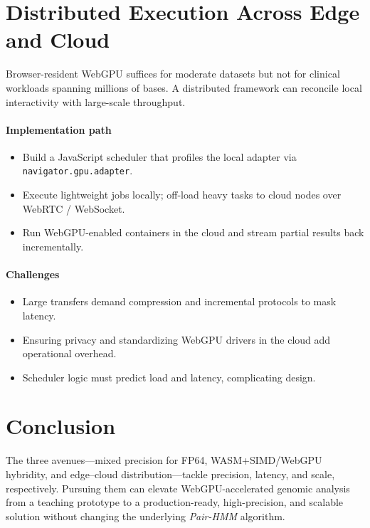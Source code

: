 \documentclass[PhD]{PHlab-thesis}
\begin{document}
\section{Distributed Execution Across Edge and Cloud}

Browser-resident WebGPU suffices for moderate datasets but not for clinical workloads spanning millions of bases\cite{W3C2024-webgpu,MDN2025-webgpuapi}.  
A distributed framework can reconcile local interactivity with large-scale throughput\cite{Krampis2012,Stone2010-opencl}.

\paragraph{Implementation path}
\begin{itemize}
  \item Build a JavaScript scheduler that profiles the local adapter via \\ \texttt{navigator.gpu.adapter}\cite{MDN2025-webgpuapi}.
  \item Execute lightweight jobs locally; off-load heavy tasks to cloud nodes over WebRTC / WebSocket\cite{W3C2024-webgpu}.
  \item Run WebGPU-enabled containers in the cloud and stream partial results back incrementally\cite{Krampis2012}.
\end{itemize}

\paragraph{Challenges}
\begin{itemize}
  \item Large transfers demand compression and incremental protocols to mask latency\cite{Stone2010-opencl}.
  \item Ensuring privacy and standardizing WebGPU drivers in the cloud add operational overhead\cite{W3C2024-webgpu}.
  \item Scheduler logic must predict load and latency, complicating design\cite{Krampis2012}.
\end{itemize}


\section*{Conclusion}

The three avenues—mixed precision for FP64, WASM+SIMD/WebGPU hybridity, and edge–cloud distribution—tackle precision, latency, and scale, respectively. Pursuing them can elevate WebGPU-accelerated genomic analysis from a teaching prototype to a production-ready, high-precision, and scalable solution without changing the underlying \emph{Pair-HMM} algorithm.
\end{document}
